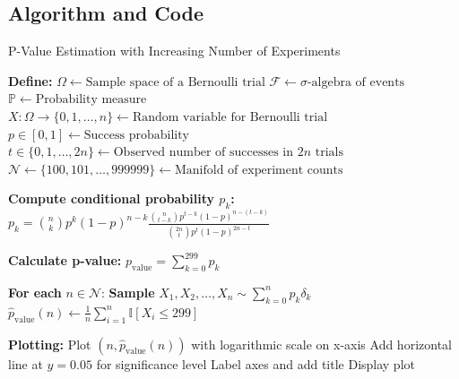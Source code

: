 \documentclass[12pt]{article}
\begin{document}
\newpage

\subsection*{Algorithm and Code}

\begin{algorithm}
\caption{P-Value Estimation with Increasing Number of Experiments}
\begin{algorithmic}[1]

\State \textbf{Define:} 
\State \indent $\Omega \gets \text{Sample space of a Bernoulli trial}$
\State \indent $\mathcal{F} \gets \sigma\text{-algebra of events}$
\State \indent $\mathbb{P} \gets \text{Probability measure}$
\State \indent $X: \Omega \to \{0, 1, \dots, n\} \gets \text{Random variable for Bernoulli trial}$
\State \indent $p \in [0,1] \gets \text{Success probability}$
\State \indent $t \in \{0, 1, \dots, 2n\} \gets \text{Observed number of successes in } 2n \text{ trials}$
\State \indent $\mathcal{N} \gets \{100, 101, \dots, 999999\} \gets \text{Manifold of experiment counts}$

\State \textbf{Compute conditional probability $p_k$:}
\State \indent $p_k = \binom{n}{k} p^k (1-p)^{n-k} \frac{\binom{n}{t-k} p^{t-k} (1-p)^{n-(t-k)}}{\binom{2n}{t} p^t (1-p)^{2n-t}}$

\State \textbf{Calculate p-value:}
\State \indent $p_{\text{value}} = \sum_{k=0}^{299} p_k$

\State \textbf{For each} $n \in \mathcal{N}$:
\State \indent \textbf{Sample} $X_1, X_2, \dots, X_n \sim \sum_{k=0}^n p_k \delta_k$
\State \indent $\hat{p}_{\text{value}}(n) \gets \frac{1}{n} \sum_{i=1}^n \mathbb{I}[X_i \leq 299]$

\State \textbf{Plotting:}
\State \indent Plot $(n, \hat{p}_{\text{value}}(n))$ with logarithmic scale on x-axis
\State \indent Add horizontal line at $y = 0.05$ for significance level
\State \indent Label axes and add title
\State \indent Display plot

\end{algorithmic}
\end{algorithm}
\end{document}
